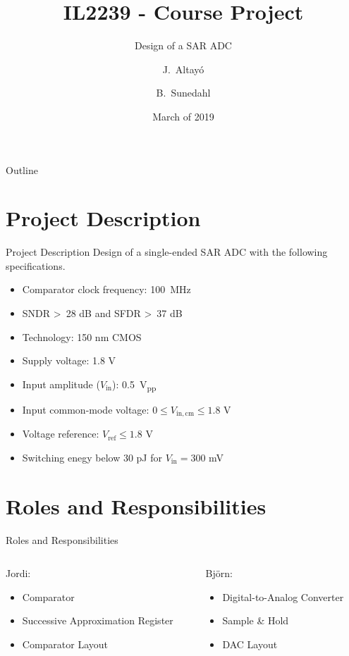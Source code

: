 \documentclass{beamer}
\title{IL2239 - Course Project}
\subtitle{Design of a SAR ADC}
\author{J.~Altayó \and B.~Sunedahl}
\date{March of 2019}
\newcommand*{\subb}[1]{\ensuremath{_{\mathrm{#1}}}}
\begin{document}
 \section*{}
 \begin{frame}[plain, t]
  \titlepage
 \end{frame}
 
 \begin{frame}{Outline}
  \begin{multicols}{2}
   \tableofcontents
  \end{multicols}
 \end{frame}
 \section{Project Description}
 \begin{frame}{Project Description}
  Design of a single-ended SAR ADC with the following specifications.
  \begin{itemize}
   \item Comparator clock frequency: \SI{100}{\MHz}
   \item SNDR \textgreater\ 28 dB and SFDR \textgreater\ 37 dB
   \item Technology: 150 nm CMOS
   \item Supply voltage: 1.8 V
   \item Input amplitude ($V\subb{in}$): \SI{0.5}{\volt_{pp}}
   \item Input common-mode voltage: $0 \leq V\subb{in,cm} \leq 1.8$ V
   \item Voltage reference: $V\subb{ref} \leq 1.8$ V
   \item Switching enegy below 30 pJ for $V\subb{in}=300$ mV
  \end{itemize}
 \end{frame}
 
 \section{Roles and Responsibilities}
 \begin{frame}{Roles and Responsibilities}
  \begin{columns}
   \begin{column}{0.5\textwidth}
    Jordi:
    \begin{itemize}
     \item Comparator
     \item Successive Approximation Register
     \item Comparator Layout
    \end{itemize}
   \end{column}
   \begin{column}{0.5\textwidth}
    Björn:
    \begin{itemize}
     \item Digital-to-Analog Converter
     \item Sample \& Hold
     \item DAC Layout
    \end{itemize}
   \end{column}
  \end{columns}
 \end{frame}
\end{document}
